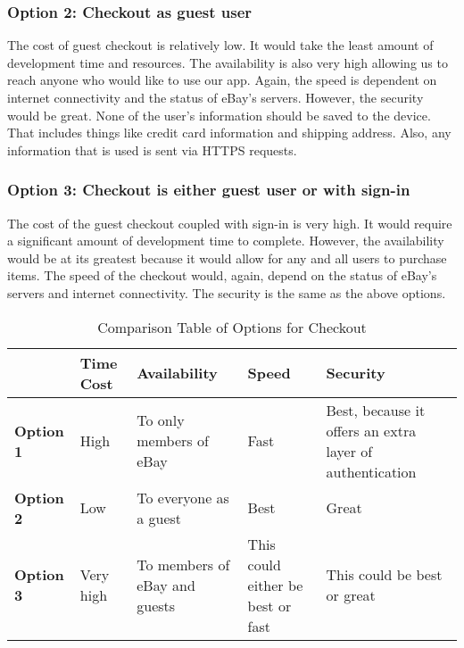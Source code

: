 \documentclass[journal,compsoc, 10pt, draftclsnofoot, onecolumn]{IEEEtran}
\begin{document}
\subsubsection*{Option 2: Checkout as guest user}
The cost of guest checkout is relatively low. It would take the least amount of
development time and resources. The availability is also very high allowing us
to reach anyone who would like to use our app. Again, the speed is dependent on
internet connectivity and the status of eBay's servers. However, the security
would be great. None of the user's information should be saved to the device.
That includes things like credit card information and shipping address. Also,
any information that is used is sent via HTTPS requests.

\subsubsection*{Option 3: Checkout is either guest user or with sign-in}
The cost of the guest checkout coupled with sign-in is very high. It would
require a significant amount of development time to complete. However, the
availability would be at its greatest because it would allow for any and all
users to purchase items. The speed of the checkout would, again, depend on the
status of eBay's servers and internet connectivity. The security is the same as
the above options.

\begin{table}[!h]
\centering
\caption{Comparison Table of Options for Checkout}
\label{Comparison Table of Options for Checkout}
\begin{tabularx}{\textwidth}{|l|l|l|l|X|}
\hline
\textbf{} & \textbf{Time Cost} & \textbf{Availability} & \textbf{Speed} &
\textbf{Security} \\ \hline
\textbf{Option 1} & High & To only members of eBay & Fast & Best, because it
offers an extra layer of authentication \\ \hline
\textbf{Option 2} & Low & To everyone as a guest & Best & Great \\ \hline
\textbf{Option 3} & Very high & To members of eBay and guests & This could
either be best or fast & This could be best or great \\ \hline
\end{tabularx}
\end{table}
\end{document}
